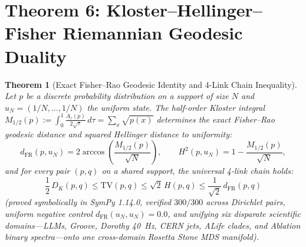 \documentclass[11pt,letterpaper]{article}
\newtheorem{theorem}{Theorem}
\begin{document}
\section{Theorem 6: Kloster--Hellinger--Fisher Riemannian Geodesic Duality}
\begin{theorem}[Exact Fisher--Rao Geodesic Identity and 4-Link Chain Inequality]
\label{thm:fisher}
Let $p$ be a discrete probability distribution on a support of size $N$ and $u_N = (1/N, \dots, 1/N)$ the uniform state. The half-order Kloster integral $M_{1/2}(p) := \int_0^1 \frac{A_\tau(p)}{2\sqrt{\tau}}\,d\tau = \sum_x \sqrt{p(x)}$ determines the exact Fisher--Rao geodesic distance and squared Hellinger distance to uniformity:
\begin{equation}
  d_{\mathrm{FR}}(p, u_N) = 2\arccos\!\left(\frac{M_{1/2}(p)}{\sqrt{N}}\right),
  \qquad
  H^2(p, u_N) = 1 - \frac{M_{1/2}(p)}{\sqrt{N}},
\end{equation}
and for every pair $(p, q)$ on a shared support, the universal 4-link chain holds:
\begin{equation}
  \frac{1}{2}\,D_K(p, q) \le \mathrm{TV}(p, q) \le \sqrt{2}\,H(p, q) \le \frac{1}{\sqrt{2}}\,d_{\mathrm{FR}}(p, q)
\end{equation}
(proved symbolically in SymPy 1.14.0, verified $300/300$ across Dirichlet pairs, uniform negative control $d_{\mathrm{FR}}(u_N, u_N) = 0.0$, and unifying six disparate scientific domains---LLMs, Groove, Dorothy 40~Hz, CERN jets, ALife clades, and Ablation binary spectra---onto one cross-domain Rosetta Stone MDS manifold).
\end{theorem}
\end{document}
